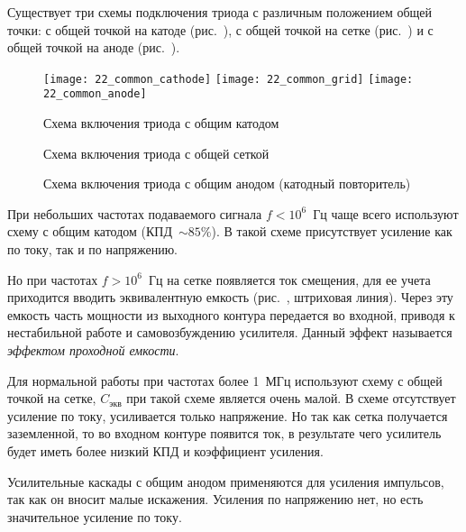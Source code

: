 

Существует три схемы подключения триода с различным положением общей точки: с
общей точкой на катоде (рис.~), с общей точкой на сетке
(рис.~) и с общей точкой на аноде (рис.~).
\vspace{-1.3em}
\begin{figure}[h!]
  \center
  \texttt{[image: 22\_common\_cathode]} \hspace{1em}
  \texttt{[image: 22\_common\_grid]} \hspace{1em}
  \texttt{[image: 22\_common\_anode]} \\
  \parbox{.3\textwidth}{\caption{Схема включения триода с общим катодом}
    \label{pic22cc}} \hspace{1em}
  \parbox{.3\textwidth}{\caption{Схема включения триода с общей сеткой}
    \label{pic22cg}} \hspace{1em}
  \parbox{.3\textwidth}{\caption{Схема включения триода с общим анодом (катодный
    повторитель)} \label{pic22ca}}
\end{figure}
\vspace{-1.5em}

При небольших частотах подаваемого сигнала \( f < 10^6 \)~Гц чаще всего
используют схему с общим катодом (КПД~\( \sim 85\% \)). В такой схеме
присутствует усиление как по току, так и по напряжению.

Но при частотах \( f > 10^6 \)~Гц на сетке появляется ток смещения, для ее учета
приходится вводить эквивалентную емкость (рис.~, штриховая линия).
Через эту емкость часть мощности из выходного контура передается во входной,
приводя к нестабильной работе и самовозбуждению усилителя. Данный эффект
называется \emph{эффектом проходной емкости}.

Для нормальной работы при частотах более 1~МГц используют схему с общей точкой
на сетке, \( C_\text{экв} \) при такой схеме является очень малой. В схеме
отсутствует усиление по току, усиливается только напряжение. Но так как
сетка получается заземленной, то во входном контуре появится ток, в результате
чего усилитель будет иметь более низкий КПД и коэффициент усиления.

Усилительные каскады с общим анодом применяются для усиления импульсов, так как
он вносит малые искажения. Усиления по напряжению нет, но есть значительное
усиление по току.

